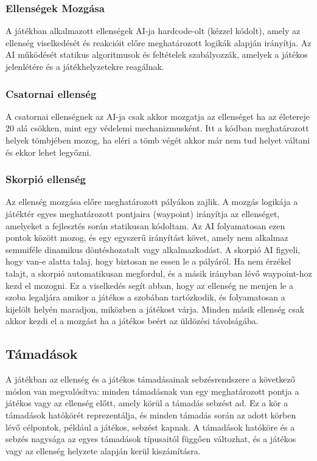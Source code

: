 \documentclass[
]{thesis-ekf}
\theoremstyle{definition}
\theoremstyle{remark}
\begin{document}
\subsubsection{Ellenségek Mozgása}
A játékban alkalmazott ellenségek AI-ja hardcode-olt (kézzel kódolt), amely az ellenség viselkedését és reakcióit előre meghatározott logikák alapján irányítja. Az AI működését statikus algoritmusok és feltételek szabályozzák, amelyek a játékos jelenlétére és a játékhelyzetekre reagálnak.
\subsubsection{Csatornai ellenség}
A csatornai ellenségnek az AI-ja csak akkor mozgatja az ellenséget ha az életereje 20 alá csökken, mint egy védelemi mechanizmusként. Itt a kódban meghatározott helyek tömbjében mozog, ha eléri a tömb végét akkor már nem tud helyet váltani és ekkor lehet legyőzni.
\subsubsection{Skorpió ellenség}
Az ellenség mozgása előre meghatározott pályákon zajlik. A mozgás logikája a játéktér egyes meghatározott pontjaira (waypoint) irányítja az ellenséget, amelyeket a fejlesztés során statikusan kódoltam. Az AI folyamatosan ezen pontok között mozog, és egy egyszerű irányítást követ, amely nem alkalmaz semmiféle dinamikus döntéshozatalt vagy alkalmazkodást.
A skorpió AI figyeli, hogy van-e alatta talaj, hogy biztosan ne essen le a pályáról. Ha nem érzékel talajt, a skorpió automatikusan megfordul, és a másik irányban lévő waypoint-hoz kezd el mozogni. Ez a viselkedés segít abban, hogy az ellenség ne menjen le a szoba legaljára amikor a játékos a szobában tartózkodik, és folyamatosan a kijelölt helyén maradjon, miközben a játékost várja.
Minden másik ellenség csak akkor kezdi el a mozgást ha a játékos beért az üldözési távolságába.
\subsection{Támadások}
A játékban az ellenség és a játékos támadásainak sebzésrendszere a következő módon van megvalósítva: minden támadásnak van egy meghatározott pontja a játékos vagy az ellenség előtt, amely körül a támadás sebzést ad. Ez a kör a támadások hatókörét reprezentálja, és minden támadás során az adott körben lévő célpontok, például a játékos, sebzést kapnak. A támadások hatóköre és a sebzés nagysága az egyes támadások típusaitól függően változhat, és a játékos vagy az ellenség helyzete alapján kerül kiszámításra.
\end{document}

